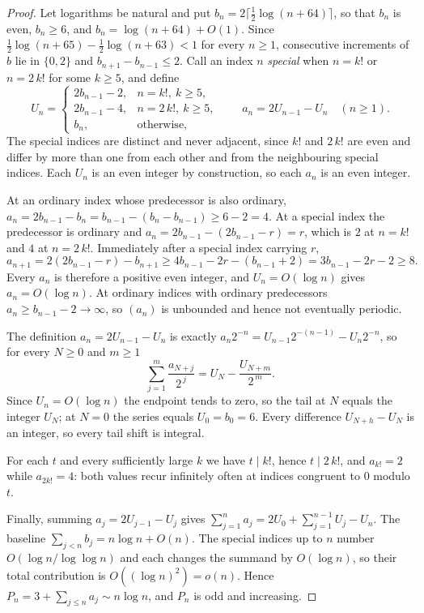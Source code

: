 \begin{proof}
Let logarithms be natural and put $b_n=2\lceil\tfrac12\log(n+64)\rceil$, so
that $b_n$ is even, $b_n\ge6$, and $b_n=\log(n+64)+O(1)$.  Since
$\tfrac12\log(n+65)-\tfrac12\log(n+63)<1$ for every $n\ge1$, consecutive
increments of $b$ lie in $\{0,2\}$ and $b_{n+1}-b_{n-1}\le2$.  Call an index
$n$ \emph{special} when $n=k!$ or $n=2\,k!$ for some $k\ge5$, and define
\[
 U_n=\begin{cases}
  2b_{n-1}-2,& n=k!,\ k\ge5,\\
  2b_{n-1}-4,& n=2\,k!,\ k\ge5,\\
  b_n,&\text{otherwise},
 \end{cases}
 \qquad a_n=2U_{n-1}-U_n\quad(n\ge1).
\]
The special indices are distinct and never adjacent, since $k!$ and $2\,k!$ are
even and differ by more than one from each other and from the neighbouring
special indices.  Each $U_n$ is an even integer by construction, so
each $a_n$ is an even integer.

At an ordinary index whose predecessor is also ordinary,
$a_n=2b_{n-1}-b_n=b_{n-1}-(b_n-b_{n-1})\ge6-2=4$.  At a special index the
predecessor is ordinary and $a_n=2b_{n-1}-(2b_{n-1}-r)=r$, which is $2$ at
$n=k!$ and $4$ at $n=2\,k!$.  Immediately after a special index carrying $r$,
\[
 a_{n+1}=2(2b_{n-1}-r)-b_{n+1}\ge4b_{n-1}-2r-(b_{n-1}+2)
 =3b_{n-1}-2r-2\ge8 .
\]
Every $a_n$ is therefore a positive even integer, and $U_n=O(\log n)$ gives
$a_n=O(\log n)$.  At ordinary indices with ordinary predecessors
$a_n\ge b_{n-1}-2\to\infty$, so $(a_n)$ is unbounded and hence not eventually
periodic.

The definition $a_n=2U_{n-1}-U_n$ is exactly $a_n2^{-n}=U_{n-1}2^{-(n-1)}-U_n2^{-n}$,
so for every $N\ge0$ and $m\ge1$
\[
 \sum_{j=1}^{m}\frac{a_{N+j}}{2^{\,j}}=U_N-\frac{U_{N+m}}{2^{\,m}} .
\]
Since $U_n=O(\log n)$ the endpoint tends to zero, so the tail at $N$ equals the
integer $U_N$; at $N=0$ the series equals $U_0=b_0=6$.  Every difference
$U_{N+h}-U_N$ is an integer, so every tail shift is integral.

For each $t$ and every sufficiently large $k$ we have $t\mid k!$, hence
$t\mid2\,k!$, and $a_{k!}=2$ while $a_{2k!}=4$: both values recur infinitely
often at indices congruent to $0$ modulo $t$.

Finally, summing $a_j=2U_{j-1}-U_j$ gives
$\sum_{j=1}^{n}a_j=2U_0+\sum_{j=1}^{n-1}U_j-U_n$.  The baseline
$\sum_{j<n}b_j=n\log n+O(n)$.  The special indices up to $n$ number
$O(\log n/\log\log n)$ and each changes the summand by $O(\log n)$, so their
total contribution is $O((\log n)^2)=o(n)$.  Hence
$P_n=3+\sum_{j\le n}a_j\sim n\log n$, and $P_n$ is odd and increasing.
\end{proof}

